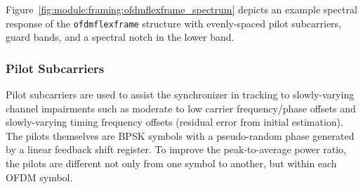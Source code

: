 %
Figure~\ref{fig:module:framing:ofdmflexframe_spectrum} depicts an
example spectral response of the {\tt ofdmflexframe} structure
with evenly-spaced pilot subcarriers, guard bands, and a spectral notch
in the lower band.


\subsubsection{Pilot Subcarriers}
\label{module:framing:ofdmflexframe:pilots}
Pilot subcarriers are used to assist the synchronizer in tracking to
slowly-varying channel impairments such as
moderate to low carrier frequency/phase offsets
and slowly-varying timing frequency offsets
(residual error from initial estimation).
The pilots themselves are BPSK symbols with a pseudo-random phase
generated by a linear feedback shift register. %
To improve the peak-to-average power ratio, the pilots are different not
only from one symbol to another, but within each OFDM symbol.


